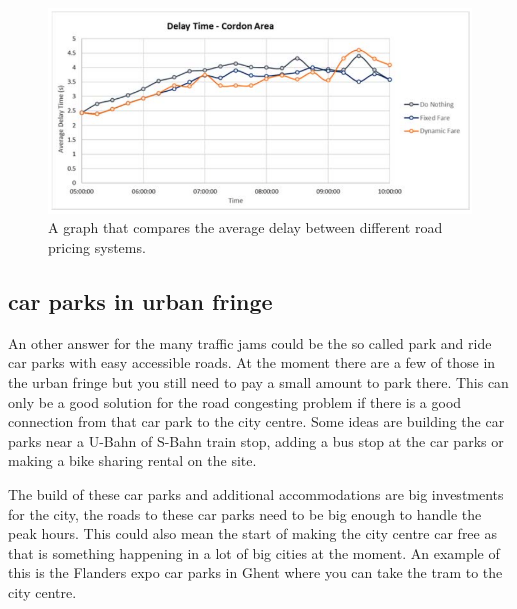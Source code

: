 \begin{figure}[h!]
	\centering
	\includegraphics[width=0.55\textheight]{ProblemsFigures/dynamicRoadPricing}
	\caption{A graph that compares the average delay between different road pricing systems. }
	\label{fig:dynroad}
\end{figure}

\subsection{car parks in urban fringe} \label{subsec:parkin}
An other answer for the many traffic jams could be the so called park and ride car parks with easy accessible roads. At the moment there are a few of those in the urban fringe but you still need to pay a small amount to park there. This can only be a good solution for the road congesting problem if there is a good connection from that car park to the city centre. Some ideas are building the car parks near a U-Bahn of S-Bahn train stop, adding a bus stop at the car parks or making a bike sharing rental on the site. \\ \newline 

The build of these car parks and additional accommodations are big investments for the city, the roads to these car parks need to be big enough to handle the peak hours. This could also mean the start of making the city centre car free as that is something happening in a lot of big cities at the moment. An example of this is the Flanders expo car parks in Ghent where you can take the tram to the city centre. 

